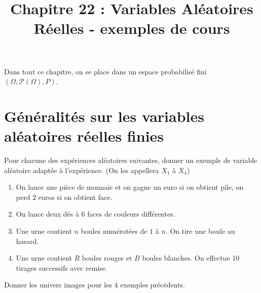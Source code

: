 \documentclass[a4paper, 11pt]{article}
\begin{document}
 \title{Chapitre 22  : Variables Aléatoires Réelles - exemples de cours} 

 Dans tout ce chapitre, on se place dans un espace probabilis\'e fini $(\Omega, \mathcal{P}(\Omega),P)$.

\section{G\'en\'eralit\'es sur les variables al\'eatoires r\'eelles finies}

\begin{exemple}
Pour chacune des exp\'eriences al\'eatoires suivantes, donner un exemple de variable aléatoire adaptée à l'expérience. (On les appellera $X_1$ à $X_4$)
\begin{enumerate}
\item On lance une pi\`ece de monnaie  et on gagne un euro si on obtient pile, on perd $2$ euros si on obtient face. 
\item On lance deux d\'es à 6 faces de couleurs différentes.
\item Une urne contient $n$ boules numérotées de $1$ à $n$. On tire une boule au hasard.
\item Une urne contient $R$ boules rouges et $B$ boules blanches. On effectue $10$ tirages successifs avec remise.
\end{enumerate}
\end{exemple}

\vspace{12cm}




\begin{exemple}
Donner les univers images pour les $4$ exemples pr\'ec\'edents.

\end{exemple}

\vspace{4cm}



\end{document}
